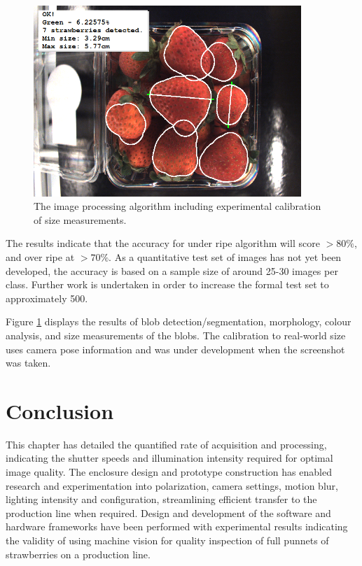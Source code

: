 \documentclass[fleqn,twoside,12pt]{report}
\begin{document}
\begin{figure}[h!]
	\centering
	\includegraphics[width=0.9\textwidth]{seg_4.png}
	\caption{The image processing algorithm including experimental calibration of size measurements.}
	\label{fig:seg_4}
\end{figure}  



The results indicate that the accuracy for under ripe algorithm will score $>80\%$, and over ripe at $>70\%$. As a quantitative test set of images has not yet been developed, the accuracy is based on a sample size of around 25-30 images per class. Further work is undertaken in order to increase the formal test set to approximately 500.   

Figure \ref{fig:seg_4} displays the results of blob detection/segmentation, morphology, colour analysis, and size measurements of the blobs. The calibration to real-world size uses camera pose information and was under development when the screenshot was taken.



\section{Conclusion} 


This chapter has detailed the quantified rate of acquisition and processing, indicating the shutter speeds and illumination intensity required for optimal image quality. The enclosure design and prototype construction has enabled research and experimentation into polarization, camera settings, motion blur, lighting intensity and configuration, streamlining efficient transfer to the production line when required. Design and development of the software and hardware frameworks have been performed with experimental results indicating the validity of using machine vision for quality inspection of full punnets of strawberries on a production line. 
\end{document}
